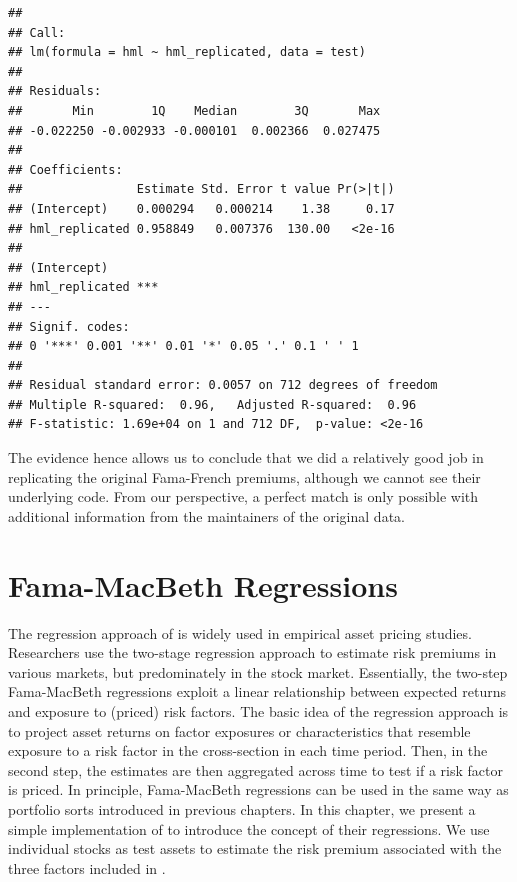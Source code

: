 \documentclass[
]{krantz}
\begin{document}
\begin{verbatim}
## 
## Call:
## lm(formula = hml ~ hml_replicated, data = test)
## 
## Residuals:
##       Min        1Q    Median        3Q       Max 
## -0.022250 -0.002933 -0.000101  0.002366  0.027475 
## 
## Coefficients:
##                Estimate Std. Error t value Pr(>|t|)
## (Intercept)    0.000294   0.000214    1.38     0.17
## hml_replicated 0.958849   0.007376  130.00   <2e-16
##                   
## (Intercept)       
## hml_replicated ***
## ---
## Signif. codes:  
## 0 '***' 0.001 '**' 0.01 '*' 0.05 '.' 0.1 ' ' 1
## 
## Residual standard error: 0.0057 on 712 degrees of freedom
## Multiple R-squared:  0.96,   Adjusted R-squared:  0.96 
## F-statistic: 1.69e+04 on 1 and 712 DF,  p-value: <2e-16
\end{verbatim}

The evidence hence allows us to conclude that we did a relatively good job in replicating the original Fama-French premiums, although we cannot see their underlying code.
From our perspective, a perfect match is only possible with additional information from the maintainers of the original data.

\hypertarget{fama-macbeth-regressions}{%
\chapter{Fama-MacBeth Regressions}\label{fama-macbeth-regressions}}

The regression approach of \citet{Fama1973} is widely used in empirical asset pricing studies.
Researchers use the two-stage regression approach to estimate risk premiums in various markets, but predominately in the stock market.
Essentially, the two-step Fama-MacBeth regressions exploit a linear relationship between expected returns and exposure to (priced) risk factors.
The basic idea of the regression approach is to project asset returns on factor exposures or characteristics that resemble exposure to a risk factor in the cross-section in each time period.
Then, in the second step, the estimates are then aggregated across time to test if a risk factor is priced.
In principle, Fama-MacBeth regressions can be used in the same way as portfolio sorts introduced in previous chapters.
In this chapter, we present a simple implementation of \citet{Fama1973} to introduce the concept of their regressions. We use individual stocks as test assets to estimate the risk premium associated with the three factors included in \citet{Fama1993}.
\end{document}
